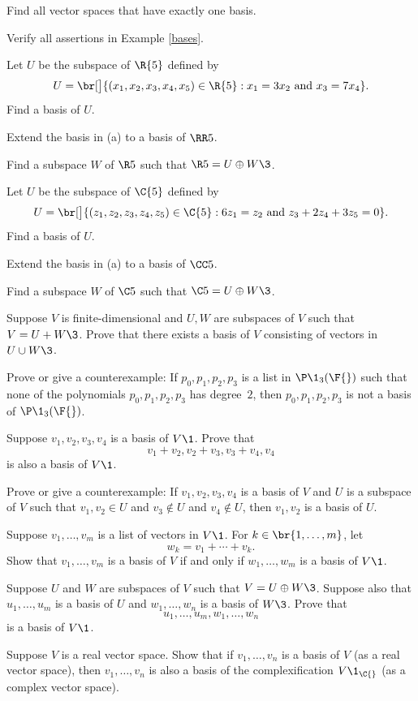 
\exercise
Find all vector spaces that have exactly one basis.


\exercise
Verify all assertions in Example \ref{bases}.


\exercise
\begin{SUBtheorem}
\item
Let $U$ be the subspace of $\R{5}$ defined by
\[
U =
\br[\big]{ (x_1, x_2, x_3, x_4, x_5) \in \R{5}: x_1 = 3 x_2 \mbox{\ and\ } x_3 = 7x_4}.
\]
Find a basis of $U$.
\item
Extend the basis in (a) to a basis of $\RR5$.
\item
Find a subspace $W$ of $\R5$ such that $\R5 = U \oplus W\3$.
\end{SUBtheorem}


\exercise
\begin{SUBtheorem}
\item
Let $U$ be the subspace of $\C{5}$ defined by
\[
U =
\br[\big]{ (z_1, z_2, z_3, z_4, z_5) \in \C{5}: 6 z_1 = z_2 \mbox{\ and\ } z_3 + 2z_4 + 3z_5 = 0}.
\]
Find a basis of $U$.
\item
Extend the basis in (a) to a basis of $\CC5$.
\item
Find a subspace $W$ of $\C5$ such that $\C5 = U \oplus W\3$.
\end{SUBtheorem}


\exercise
Suppose $V$ is finite-dimensional and $U, W$ are subspaces of $V$ such that $V = U + W\3$. Prove that there exists a basis of $V$ consisting of vectors in $U \cup W\3$.


\exercise
Prove or give a counterexample: If $p_0, p_1, p_2, p_3$ is a list in $\P\1_3(\F{})$ such
that none of the polynomials $p_0, p_1, p_2, p_3$ has degree~$2$, then $p_0, p_1, p_2, p_3$ is not a basis of $\P\1_3(\F{})$.


\exercise
Suppose $v_1, v_2, v_3, v_4$ is a basis of $V\1$. Prove that
\[
v_1 + v_2, v_2 + v_3, v_3 + v_4, v_4
\]
is also a basis of $V\1$.


\exercise
Prove or give a counterexample: If $v_1, v_2, v_3, v_4$ is a basis of $V$ and $U$ is a subspace of $V$ such that $v_1, v_2 \in U$ and $v_3 \notin U$ and $v_4 \notin U$, then $v_1, v_2$ is a basis of $U$.


\exercise
Suppose $v_1, \ldots, v_m$ is a list of vectors in $V\1$. For $k \in \br{1, \ldots, m}$, let
\[
w_k = v_1 + \cdots + v_k.
\]
Show that $v_1, \ldots, v_m$ is a basis of $V$ if and only if $w_1, \ldots, w_m$ is a basis of $V\1$.


\exercise
Suppose $U$ and $W$ are subspaces of $V$ such that $V = U \oplus W\3$. Suppose also that $u_1, \dots, u_m$ is a basis of $U$ and $w_1, \dots, w_n$ is a basis of $W\3$. Prove that
\[
u_1, \dots, u_m, w_1, \dots, w_n
\]
is a basis of $V\1$.


\exercise
Suppose $V$ is a real vector space.
Show that if $v_1, \dots, v_n$ is a basis of $V$ (as a real vector space), then
$v_1, \dots, v_n$ is also a basis of the complexification $V\1_{\C{}}$ (as a complex vector space).


